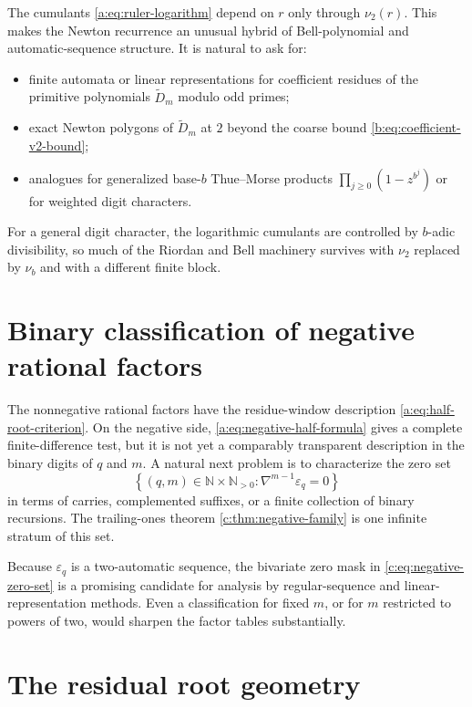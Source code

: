 \documentclass[11pt,a4paper,oneside,openany]{book}
\numberwithin{equation}{chapter}
\theoremstyle{definition}
\theoremstyle{remark}
\newcommand{\N}{\mathbb N}
\newcommand{\eps}{\varepsilon}
\newcommand{\vtwo}{\nu_2}
\newcommand{\Dprim}{\widetilde D}
\begin{document}
The cumulants \eqref{a:eq:ruler-logarithm} depend on $r$ only through $\vtwo(r)$.  This
makes the Newton recurrence an unusual hybrid of Bell-polynomial and
automatic-sequence structure.  It is natural to ask for:
\begin{itemize}
 \item finite automata or linear representations for coefficient residues of
       the primitive polynomials $\Dprim_m$ modulo odd primes;
 \item exact Newton polygons of $\Dprim_m$ at $2$ beyond the coarse bound
       \eqref{b:eq:coefficient-v2-bound};
 \item analogues for generalized base-$b$ Thue--Morse products
       $\prod_{j\ge0}(1-z^{b^j})$ or for weighted digit characters.
\end{itemize}
For a general digit character, the logarithmic cumulants are controlled by
$b$-adic divisibility, so much of the Riordan and Bell machinery survives
with $\vtwo$ replaced by $\nu_b$ and with a different finite block.
\section{Binary classification of negative rational factors}

The nonnegative rational factors have the residue-window description
\cref{a:eq:half-root-criterion}.  On the negative side,
\cref{a:eq:negative-half-formula} gives a complete finite-difference test, but it
is not yet a comparably transparent description in the binary digits of
\(q\) and \(m\).  A natural next problem is to characterize the zero set
\begin{equation}
 \left\{(q,m)\in\N\times\N_{>0}:
   \nabla^{m-1}\eps_q=0\right\}                           \label{c:eq:negative-zero-set}
\end{equation}
in terms of carries, complemented suffixes, or a finite collection of
binary recursions.  The trailing-ones theorem
\cref{c:thm:negative-family} is one infinite stratum of this set.

Because \(\eps_q\) is a two-automatic sequence, the bivariate zero mask in
\cref{c:eq:negative-zero-set} is a promising candidate for analysis by
regular-sequence and linear-representation methods.  Even a classification
for fixed \(m\), or for \(m\) restricted to powers of two, would sharpen
the factor tables substantially.

\section{The residual root geometry}
\end{document}
